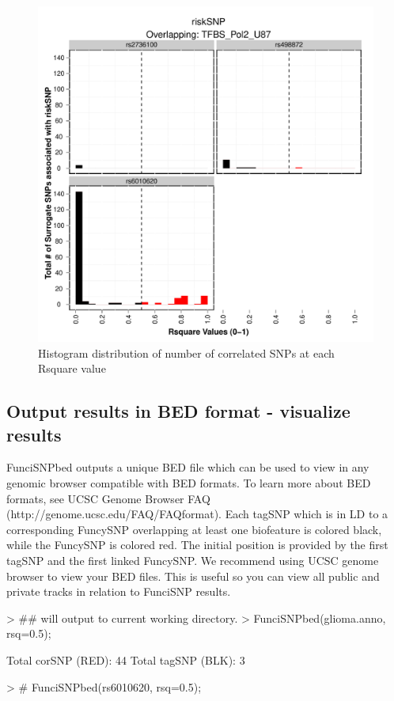 \documentclass[a4paper]{article}
\begin{document}
\begin{figure}[ht!]
\begin{center}
\includegraphics{FunciSNP.0.1.7/plots/TFBS_Pol2_U87_R2summary_riskSNP.pdf}
\caption{\label{fig:TFBS_Pol2_U87_R2summary_riskSNP.pdf} Histogram 
distribution of number of correlated SNPs at each Rsquare value}
{\footnotesize{}}
\end{center}
\end{figure}

\newpage

\subsection*{Output results in BED format - visualize results}
FunciSNPbed outputs a unique BED file which can be used to view in any genomic 
browser compatible with BED formats. To learn more about BED formats, see UCSC 
Genome Browser FAQ (http://genome.ucsc.edu/FAQ/FAQformat). Each tagSNP 
which is in LD to a corresponding FuncySNP overlapping at least one biofeature
 is colored black, while the FuncySNP is colored red. The initial position is 
 provided by the first tagSNP and the first linked FuncySNP. We recommend 
 using UCSC genome browser to view your BED files. This is useful so you can 
 view all public and private tracks in relation to FunciSNP results.
\begin{Schunk}
\begin{Sinput}
> ## will output to current working directory.
> FunciSNPbed(glioma.anno, rsq=0.5);
\end{Sinput}
\begin{Soutput}
Total corSNP (RED):  44 
Total tagSNP (BLK):  3 
\end{Soutput}
\begin{Sinput}
> # FunciSNPbed(rs6010620, rsq=0.5);
\end{Sinput}
\end{Schunk}
\end{document}
